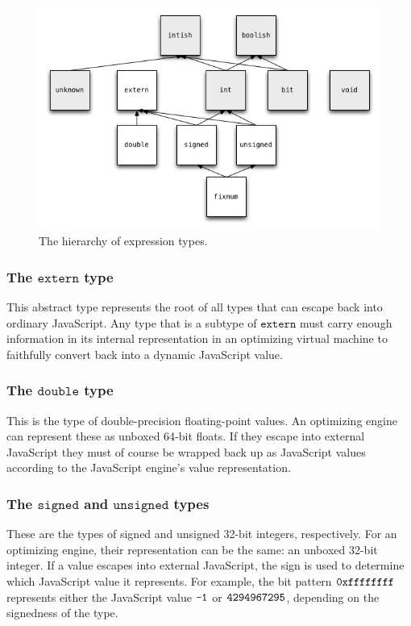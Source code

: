 \documentclass{article}
\newcommand{\mathjs}[1]{\mbox{\texttt{{#1}}}}
\newcommand{\unsigned}{\mathtt{unsigned}}
\newcommand{\signed}{\mathtt{signed}}
\newcommand{\double}{\mathtt{double}}
\newcommand{\extern}{\mathtt{extern}}
\begin{document}
\begin{figure}[tb]
\centering
\includegraphics[scale=0.5]{subtypes}
\caption{The hierarchy of expression types.}
\label{fig:subtypes}
\end{figure}

\subsubsection*{The $\extern$ type}

This abstract type represents the root of all types that can escape
back into ordinary JavaScript. Any type that is a subtype of $\extern$
must carry enough information in its internal representation in an
optimizing virtual machine to faithfully convert back into a dynamic
JavaScript value.

\subsubsection*{The $\double$ type}

This is the type of double-precision floating-point values. An
optimizing engine can represent these as unboxed 64-bit floats. If
they escape into external JavaScript they must of course be wrapped
back up as JavaScript values according to the JavaScript engine's
value representation.

\subsubsection*{The $\signed$ and $\unsigned$ types}

These are the types of signed and unsigned 32-bit integers,
respectively. For an optimizing engine, their representation can be
the same: an unboxed 32-bit integer. If a value escapes into external
JavaScript, the sign is used to determine which JavaScript value it
represents. For example, the bit pattern $\mathjs{0xffffffff}$
represents either the JavaScript value $\mathjs{-1}$ or
$\mathjs{4294967295}$, depending on the signedness of the type.
\end{document}
